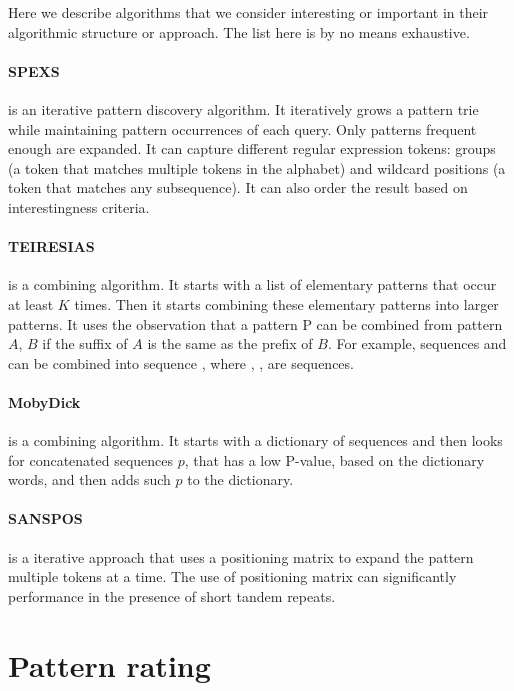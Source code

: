Here we describe algorithms that we consider interesting or important in their algorithmic structure or approach. The list here is by no means exhaustive.

\paragraph{SPEXS \cite{spexs}} is an iterative pattern discovery algorithm. It iteratively grows a pattern trie while maintaining pattern occurrences of each query. Only patterns frequent enough are expanded. It can capture different regular expression tokens: groups (a token that matches multiple tokens in the alphabet) and wildcard positions (a token that matches any subsequence). It can also order the result based on interestingness criteria.

\paragraph{TEIRESIAS \cite{TEIRESIAS}} is a combining algorithm. It starts with a list of elementary patterns that occur at least $K$ times. Then it starts combining these elementary patterns into larger patterns. It uses the observation that a pattern P can be combined from pattern $A$, $B$ if the suffix of $A$ is the same as the prefix of $B$. For example, sequences \R{$\alpha\Delta$} and \R{$\Delta\beta$}can be combined into sequence \R{$\alpha\Delta\beta$}, where \R{$\alpha$}, \R{$\Delta$}, \R{$\beta$} are sequences.

\paragraph{MobyDick \cite{MobyDick}} is a combining algorithm. It starts with a dictionary of sequences and then looks for concatenated sequences $p$, that has a low P-value, based on the dictionary words, and then adds such $p$ to the dictionary.

\paragraph{SANSPOS \cite{NewDataStructures}} is a iterative approach that uses a positioning matrix to expand the pattern multiple tokens at a time. The use of positioning matrix can significantly performance in the presence of short tandem repeats.

\section{Pattern rating}

